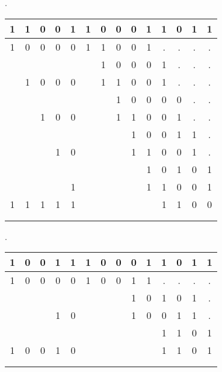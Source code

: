 \begin{problem}
\begin{enumerate}
\begin{Answer}
\begin{multicols}{3}
\noindent
{}.
\newline
\color{zaffre}
\begin{tabular}{c@{\,}c@{\,}c@{\,}c@{\,}c@{\,}|c@{\,}c@{\,}c@{\,}c@{\,}c@{\,}c@{\,}c@{\,}c@{\,}c@{\,}}
  1 & 1 & 0 & 0 & 1     & 1 & 0 & 0 & 0 & 1 & 1 & 0 & 1 & 1\\
\hline{}
  1 & 0 & 0 & 0 & 0     & 1 & 1 & 0 & 0 & 1 &.  &.  &.  &. \\
    &   &   &   &       &   & 1 & 0 & 0 & 0 & 1 &.  &.  &. \\
    & 1 & 0 & 0 & 0     &   & 1 & 1 & 0 & 0 & 1 &.  &.  &. \\
    &   &   &   &       &   &   & 1 & 0 & 0 & 0 & 0 &.  &. \\
    &   & 1 & 0 & 0     &   &   & 1 & 1 & 0 & 0 & 1 &.  &. \\
    &   &   &   &       &   &   &   & 1 & 0 & 0 & 1 & 1 &. \\
    &   &   & 1 & 0     &   &   &   & 1 & 1 & 0 & 0 & 1 &. \\
    &   &   &   &       &   &   &   &   & 1 & 0 & 1 & 0 & 1\\
    &   &   &   & 1     &   &   &   &   & 1 & 1 & 0 & 0 & 1\\
\hline{}
  1 & 1 & 1 & 1 & 1     &   &   &   &   &   & 1 & 1 & 0 & 0\\
\\
\\
\end{tabular}
\color{black}


\noindent
{}.
\newline
\color{zaffre}
\begin{tabular}{c@{\,}c@{\,}c@{\,}c@{\,}c@{\,}|c@{\,}c@{\,}c@{\,}c@{\,}c@{\,}c@{\,}c@{\,}c@{\,}c@{\,}}
  1 & 0 & 0 & 1 & 1     & 1 & 0 & 0 & 0 & 1 & 1 & 0 & 1 & 1\\
\hline{}
  1 & 0 & 0 & 0 & 0     & 1 & 0 & 0 & 1 & 1 &.  &.  &.  &. \\
    &   &   &   &       &   &   &   & 1 & 0 & 1 & 0 & 1 &. \\
    &   &   & 1 & 0     &   &   &   & 1 & 0 & 0 & 1 & 1 &. \\
    &   &   &   &       &   &   &   &   &   & 1 & 1 & 0 & 1\\
\hline{}
  1 & 0 & 0 & 1 & 0     &   &   &   &   &   & 1 & 1 & 0 & 1\\
\\
\\
\end{tabular}
\color{black}


\end{multicols}
\end{Answer}
\end{enumerate}
\end{problem}
